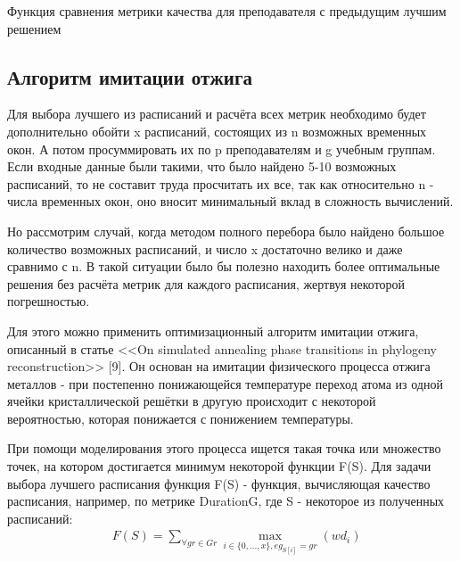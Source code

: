 \begin{algorithm} 
	\nonl{}
	\caption{Функция сравнения метрики качества для преподавателя с предыдущим лучшим решением}	
	\label{alg:algoW}
\end{algorithm} 
\FloatBarrier

\subsection{Алгоритм имитации отжига}
Для выбора лучшего из расписаний и расчёта всех метрик необходимо будет дополнительно обойти x расписаний, состоящих из n возможных временных окон. А потом просуммировать их по p преподавателям и g учебным группам. 
Если входные данные были такими, что было найдено 5-10 возможных расписаний, то не составит труда просчитать их все, так как относительно n - числа временных окон, оно вносит минимальный вклад в сложность вычислений.

Но рассмотрим случай, когда методом полного перебора было найдено большое количество возможных расписаний, и число x достаточно велико и даже сравнимо с n. В такой ситуации было бы полезно находить более оптимальные решения без расчёта метрик для каждого расписания, жертвуя некоторой погрешностью.

Для этого можно применить оптимизационный алгоритм имитации отжига, описанный в статье <<On simulated annealing phase transitions in phylogeny reconstruction>> [9]. Он основан на имитации физического процесса отжига металлов - при постепенно понижающейся температуре переход атома из одной ячейки кристаллической решётки в другую происходит с некоторой вероятностью, которая понижается с понижением температуры.

При помощи моделирования этого процесса ищется такая точка или множество точек, на котором достигается минимум некоторой функции F(S). Для задачи выбора лучшего расписания функция F(S) - функция, вычисляющая качество расписания, например, по метрике DurationG, где S - некоторое из полученных расписаний:
\begin{align}
	& {F(S)} =  \sum\limits_{\forall  gr \in Gr}\max\limits_{i \in \{0,...,x\}, eg_{S[i]} = gr}(wd_i)
\end{align}


